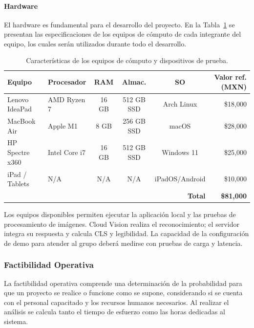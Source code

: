 \paragraph{Hardware}
 
El hardware es fundamental para el desarrollo del proyecto. En la Tabla~\ref{tab:hardware} se presentan las especificaciones de los equipos de cómputo de cada integrante del equipo, los cuales serán utilizados durante todo el desarrollo.
 
\begin{table}[H]
\centering
\caption{Características de los equipos de cómputo y dispositivos de prueba.}
\label{tab:hardware}
\renewcommand{\arraystretch}{1.3}
\begin{tabularx}{\textwidth}{|X|X|c|c|c|r|}
\hline
\textbf{Equipo} & \textbf{Procesador} & \textbf{RAM} & \textbf{Almac.} & \textbf{SO} & \textbf{Valor ref. (MXN)} \\
\hline
Lenovo IdeaPad  & AMD Ryzen 7 & 16 GB & 512 GB SSD & Arch Linux & \$18,000 \\
\hline
MacBook Air     & Apple M1 & 8 GB & 256 GB SSD & macOS & \$28,000 \\
\hline
HP Spectre x360 & Intel Core i7 & 16 GB & 512 GB SSD & Windows 11 & \$25,000 \\
\hline
iPad / Tablets  & N/A & N/A & N/A & iPadOS/Android & \$10,000 \\
\hline
\multicolumn{5}{|r|}{\textbf{Total}} & \textbf{\$81,000} \\
\hline
\end{tabularx}
\end{table}
 
Los equipos disponibles permiten ejecutar la aplicación local y las pruebas de procesamiento de imágenes. Cloud Vision realiza el reconocimiento; el servidor integra su respuesta y calcula CLS y legibilidad. La capacidad de la configuración de demo para atender al grupo deberá medirse con pruebas de carga y latencia.
 
\subsubsection{Factibilidad Operativa}
 
La factibilidad operativa comprende una determinación de la probabilidad para que un proyecto se realice o funcione como se supone, considerando si se cuenta con el personal capacitado y los recursos humanos necesarios. Al realizar el análisis se calcula tanto el tiempo de esfuerzo como las horas dedicadas al sistema. \cite{kendall2011analisis}

